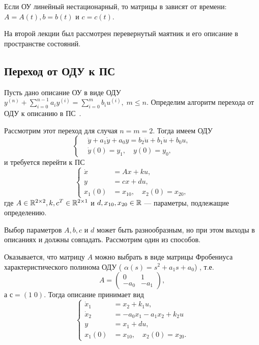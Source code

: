 \documentclass[../../TAU.tex]{subfiles}
\begin{document}
    Если ОУ линейный нестационарный, то матрицы в  зависят от времени: $A=A(t), b=b(t)$ и $c=c(t)$.

    На второй лекции был рассмотрен перевернутый маятник и его описание в пространстве состояний.

\subsection{Переход от ОДУ к ПС}

    Пусть дано описание ОУ в виде ОДУ  
    $y^{(n)}+\sum_{i=0}^{n-1}a_iy^{(i)}=\sum_{i=0}^{m}b_iu^{(i)},\; m \le n$. 
    Определим алгоритм перехода от ОДУ к описанию в ПС~.

    Рассмотрим этот переход для случая $n=m=2$. Тогда имеем ОДУ
    \begin{equation}\label{ODU_2}
        \left\{
        \begin{aligned}
            &\ddot y + a_1 \dot y + a_0 y = b_2 \ddot{u} + b_1 \dot u + b_0 u,\\
            &\dot y(0) = y_1,\quad y(0) = y_0,
        \end{aligned}\right.
    \end{equation}
        и требуется перейти к ПС
    \begin{equation}\label{STDS_2}
        \left\{
        \begin{aligned}
            \dot x &= Ax + ku,\\
            y &= cx + du,\\
            x_1(0) &= x_{10},\quad x_2(0) = x_{20},
        \end{aligned}
        \right.
    \end{equation}
    где 
    $A\in\mathbb{R}^{2\times2}, k, c^T\in\mathbb{R}^{2\times1}$ 
    и 
    $d,x_{10}, x_{20}\in\mathbb{R}$ --- 
    параметры, подлежащие определению.

    Выбор параметров $A,b,c$ и $d$ может быть разнообразным, но при этом выходы в описаниях  и  должны совпадать. Рассмотрим один из способов.

    Оказывается, что матрицу $A$ можно выбрать в виде матрицы Фробениуса характеристического полинома ОДУ  (
    $\alpha(s) = s^2+a_1s+a_0$) , 
    т.е.
    $$
        A =
        \begin{pmatrix}
            0&    1\\
            -a_0& -a_1
        \end{pmatrix},
    $$
    а $с = (1\; 0)$. Тогда описание  принимает вид
    \begin{equation}\label{EQ1}
        \left\{
        \begin{aligned}
            \dot x_1 &= x_2 + k_1 u,\\
            \dot x_2 &= -a_0x_1-a_1x_2+k_2u\\
            y &= x_1 + du,\\
            x_1(0) &= x_{10},\quad x_2(0) = x_{20}.
        \end{aligned}
        \right.
    \end{equation}
\end{document}
